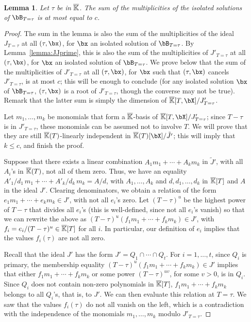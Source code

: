 \documentclass[12pt]{article}
\newtheorem{lemma}[definition]{Lemma}
\begin{document}
 
\begin{lemma}\label{lemma:19}
  Let $\tau$ be in $\overline{\mathbb{K}}$. The sum of the multiplicities of the
  isolated solutions of $\bB_{T=\tau}$ is at most equal to $c$.
\end{lemma}
\begin{proof}
  The sum in the lemma is also the sum of the multiplicities of the
  ideal $J_{T=\tau}$ at all $(\tau,\bx)$, for $\bx$ an isolated solution
  of $\bB_{T=\tau}$.  By Lemma~\ref{lemma:JJprime}, this is also the sum
  of the multiplicities of $J'_{T=\tau}$ at all $(\tau,\bx)$, for $\bx$ an
  isolated solution of $\bB_{T=\tau}$. We prove below that the sum of the
  multiplicities of $J'_{T=\tau}$ at all $(\tau,\bx)$, for $\bx$ such that
  $(\tau,\bx)$ cancels $J'_{T=\tau}$, is at most $c$; this will be enough
  to conclude (for any isolated solution $\bx$ of $\bB_{T=\tau}$,
  $(\tau,\bx)$ is a root of $J'_{T=\tau}$, though the converse may not be
  true). Remark that the latter sum is simply the dimension of
  $\KKbar[T,\bX]/J'_{T=\tau}$.
  
  Let $m_1,\dots,m_k$ be monomials that form a $\overline{\mathbb{K}}$-basis of
  $\KKbar[T,\bX]/J'_{T=\tau}$; since $T-\tau$ is in $J'_{T=\tau}$, these
  monomials can be assumed not to involve $T$.  We will prove that
  they are still $\overline{\mathbb{K}}(T)$-linearly independent in
  $\KKbar(T)[\bX]/\tilde{J'}$; this will imply that $k \le c$,
  and finish the proof.
  
  Suppose that there exists a linear combination $A_1 m_1 + \cdots +
  A_k m_k$ in $\tilde{J}'$, with all $A_i$'s in $\overline{\mathbb{K}}(T)$, not
  all of them zero. Thus, we have an equality $A'_1/d_1\, m_1 + \cdots
  + A'_k/d_k\, m_k = A/d$, with $A_1,\dots,A_k$ and
  $d,d_1,\dots,d_k$ in $\overline{\mathbb{K}}[T]$ and $A$ in the ideal
  $J'$. Clearing denominators, we obtain a relation of the form $e_1
  m_1 +\cdots+ e_k m_k \in J'$, with not all $e_i$'s zero. Let
  $(T-\tau)^u$ be the highest power of $T-\tau$ that divides all
  $e_i$'s (this is well-defined, since not all $e_i$'s vanish) so that
  we can rewrite the above as $(T-\tau)^u (f_1 m_1 +\cdots+ f_k
  m_k) \in J'$, with $f_i=e_i/(T-\tau)^u \in \overline{\mathbb{K}}[T]$ for all $i$.
  In particular, our definition of $e_i$ implies that the values
  $f_i(\tau)$ are not all zero.

  Recall that the ideal $J'$ has the form $J'=Q_1 \cap \cdots \cap
  Q_t$. For $i=1,\dots,t$, since $Q_i$ is primary, the membership
  equality $(T-\tau)^u (f_1 m_1 +\cdots +f_k m_k) \in J'$ implies
  that either $f_1 m_1 +\cdots +f_k m_k$ or some power
  $(T-\tau)^{uv}$, for some $v > 0$, is in $Q_i$. Since $Q_i$ does not
  contain non-zero polynomials in $\overline{\mathbb{K}}[T]$, $f_1 m_1 +\cdots+ f_k
  m_k$ belongs to all $Q_i$'s, that is, to $J'$. We can then
  evaluate this relation at $T=\tau$. We saw that the values
  $f_i(\tau)$ do not all vanish on the left, which is a contradiction
  with the independence of the monomials $m_1,\dots,m_k$ modulo
  $J'_{T=\tau}$.
\end{proof}
\end{document}
